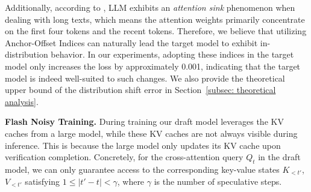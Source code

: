 Additionally, according to \citet{xiao2024efficient}, LLM exhibits an \textit{attention sink} phenomenon when dealing with long texts, which means the attention weights primarily concentrate on the first four tokens and the recent tokens. 
Therefore, we believe that utilizing Anchor-Offset Indices can naturally lead the target model to exhibit in-distribution behavior.
In our experiments, adopting these indices in the target model only increases the loss by approximately 
0.001, indicating that the target model is indeed well-suited to such changes.  
We also provide the theoretical upper bound of the distribution shift error in Section~\ref{subsec: theoretical analysis}.




\textbf{Flash Noisy Training.} During training our draft model leverages the KV caches from a large model, while these KV caches are not always visible during inference. 
This is because the large model only updates its KV cache upon verification completion. Concretely, for the cross-attention query \(Q_t\) in the draft model, we can only guarantee access to the corresponding key-value states \(K_{<t'}\), \(V_{<t'}\) satisfying
$ 1\le|t' - t|<\gamma$,
where \(\gamma\) is the number of speculative steps.


